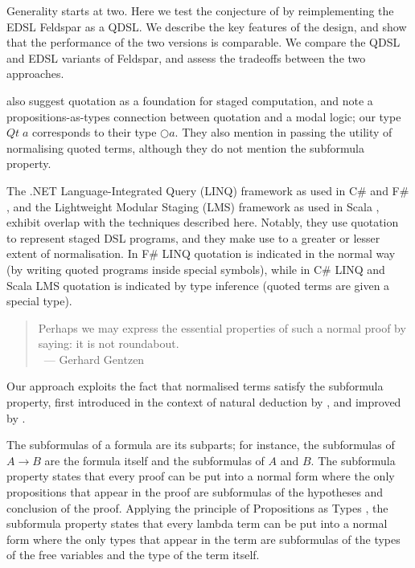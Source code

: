 \documentclass[authoryear,9pt]{sigplanconf}
\newcommand{\Conid}[1]{\mathit{#1}}
\newcommand{\Varid}[1]{\mathit{#1}}
\newcommand{\flushr}{{}\mbox{~}\hfill}%
\begin{document}
Generality starts at two.  Here we test the conjecture of
\citet{cheney:linq} by reimplementing the EDSL Feldspar
\citep{FELDSPAR} as a QDSL.  We describe the key features of the
design, and show that the performance of the two versions is
comparable.  We compare the QDSL and EDSL variants of Feldspar, and
assess the tradeoffs between the two approaches.

\citet{Davies-Pfenning-1996,Davies-Pfenning-2001} also suggest
quotation as a foundation for staged computation, and note a
propositions-as-types connection between quotation and a modal logic;
our type \ensuremath{\Conid{Qt}\;\Varid{a}} corresponds to their type $\bigcirc a$.  They also
mention in passing the utility of normalising quoted terms, although
they do not mention the subformula property.

The .NET Language-Integrated Query (LINQ) framework as used in C\# and
F\# \citep{csharplinq,fsharplinq}, and the Lightweight Modular Staging
(LMS) framework as used in Scala \citep{scalalms}, exhibit overlap
with the techniques described here.  Notably, they use quotation to
represent staged DSL programs, and they make use to a greater or
lesser extent of normalisation.  In F\# LINQ quotation is indicated in
the normal way (by writing quoted programs inside special symbols),
while in C\# LINQ and Scala LMS quotation is indicated by type
inference (quoted terms are given a special type).


\vspace{2ex}
\begin{quote}
Perhaps we may express the essential properties of such a normal proof
by saying: it is not roundabout. \\
\flushr --- Gerhard Gentzen
\end{quote}

Our approach exploits the fact that normalised terms satisfy the
subformula property, first introduced in the context
of natural deduction by \citet{Gentzen-1935},
and improved by \citet{Prawitz-1965}.

The subformulas of a formula are its subparts;
for instance, the subformulas of \ensuremath{\Conid{A}\to \Conid{B}} are the formula
itself and the subformulas of \ensuremath{\Conid{A}} and \ensuremath{\Conid{B}}.
The subformula property states that every proof can be put into a
normal form where the only propositions that appear in the proof are
subformulas of the hypotheses and conclusion of the proof. Applying
the principle of Propositions as Types
\citep{Howard-1980,Wadler-2015}, the subformula property states that
every lambda term can be put into a normal form where the only types
that appear in the term are subformulas of the types of the free
variables and the type of the term itself.
\end{document}

